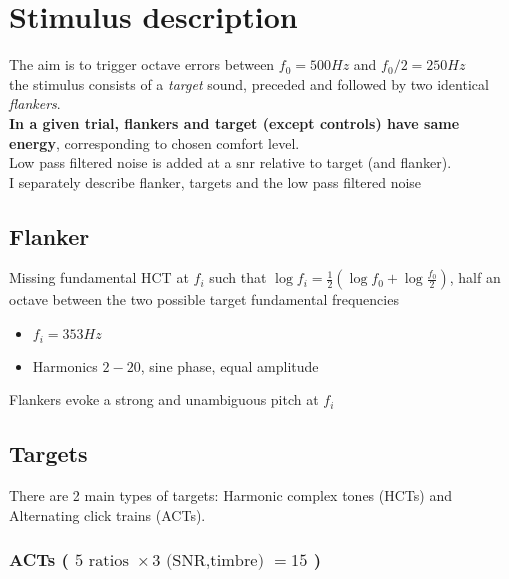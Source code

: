 \documentclass[11pt,a4paper,oneside]{article}
\begin{document}
\section{Stimulus description}

The aim is to trigger octave errors between $f_0 = 500Hz$ and $f_0/2 = 250 Hz$\\
the stimulus consists of a \textit{target} sound, preceded and followed by two identical \textit{flankers}.\\

\textbf{In a given trial, flankers and target (except controls) have same energy}, corresponding to chosen comfort level.\\

Low pass filtered noise is added at a snr relative to target (and flanker). \\

I separately describe flanker, targets and the low pass filtered noise

\subsection{Flanker}

Missing fundamental HCT at $f_i$ such that $\log f_i = \frac{1}{2}(\log f_0 + \log \frac{f_0}{2})$, half an octave between the two possible target fundamental frequencies

\begin{itemize}
\item $f_i = 353 Hz$
\item Harmonics $2-20$, sine phase, equal amplitude
\end{itemize}

Flankers evoke a strong and unambiguous pitch at $f_i$

\subsection{Targets}

There are 2 main types of targets: Harmonic complex tones (HCTs) and Alternating click trains (ACTs).

\subsubsection{ACTs (  $5 \text{ ratios } \times 3 \text{ (SNR,timbre) } = 15$  )}
\end{document}
